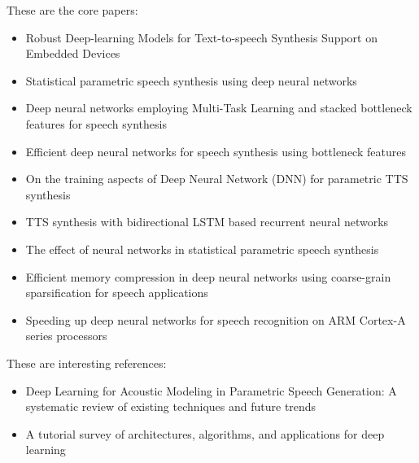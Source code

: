 \vspace{1em}

These are the core papers: 
\begin{itemize}[leftmargin=10pt]
	\item Robust Deep-learning Models for Text-to-speech Synthesis Support on Embedded Devices \cite{boros:robust}
	\item Statistical parametric speech synthesis using deep neural networks \cite{zen:deepstatistical}
	\item Deep neural networks employing Multi-Task Learning and stacked bottleneck features for speech synthesis \cite{wu:deep}
	\item Efficient deep neural networks for speech synthesis using bottleneck features \cite{joo:efficient}
	\item On the training aspects of Deep Neural Network (DNN) for parametric TTS synthesis \cite{qian:training}
	\item TTS synthesis with bidirectional LSTM based recurrent neural networks \cite{fan:tts}
	\item The effect of neural networks in statistical parametric speech synthesis \cite{hashimoto:effect}
	\item Efficient memory compression in deep neural networks using coarse-grain sparsification for speech applications \cite{kadetotad:efficient}
	\item Speeding up deep neural networks for speech recognition on ARM Cortex-A series processors \cite{xing:speeding}
\end{itemize}

\vspace{1em}

These are interesting references:

\begin{itemize}[leftmargin=10pt]
	\item Deep Learning for Acoustic Modeling in Parametric Speech Generation: A systematic review of existing techniques and future trends \cite{ling:deep}
	\item A tutorial survey of architectures, algorithms, and applications for deep learning \cite{li:survey}
\end{itemize}

\clearpage
